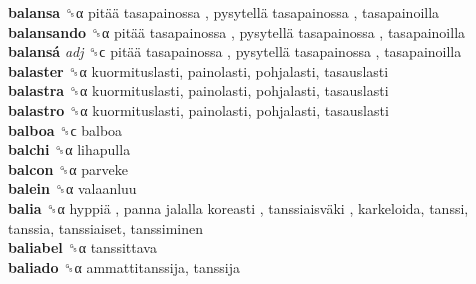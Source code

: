 \textbf{balansa} ␝α   pitää tasapainossa ,  pysytellä tasapainossa , tasapainoilla  \\
\textbf{balansando} ␝α   pitää tasapainossa ,  pysytellä tasapainossa , tasapainoilla  \\
\textbf{balansá} \emph{adj}  ␝ϲ   pitää tasapainossa ,  pysytellä tasapainossa , tasapainoilla  \\
\textbf{balaster} ␝α  kuormituslasti, painolasti, pohjalasti, tasauslasti  \\
\textbf{balastra} ␝α  kuormituslasti, painolasti, pohjalasti, tasauslasti  \\
\textbf{balastro} ␝α  kuormituslasti, painolasti, pohjalasti, tasauslasti  \\
\textbf{balboa} ␝ϲ  balboa  \\
\textbf{balchi} ␝α  lihapulla  \\
\textbf{balcon} ␝α  parveke  \\
\textbf{balein} ␝α  valaanluu  \\
\textbf{balia} ␝α   hyppiä ,  panna jalalla koreasti ,  tanssiaisväki , karkeloida, tanssi, tanssia, tanssiaiset, tanssiminen  \\
\textbf{baliabel} ␝α  tanssittava  \\
\textbf{baliado} ␝α  ammattitanssija, tanssija  \\
